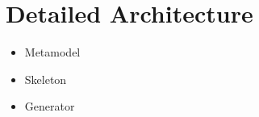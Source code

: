 \section{Detailed Architecture}
\label{DetailedArchitecture}
\begin{itemize}
 \item Metamodel 
 \item Skeleton 
 \item Generator 

\end{itemize}
